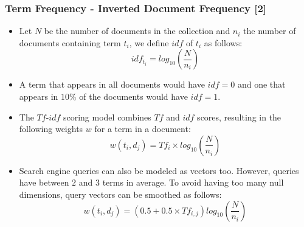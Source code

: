 \documentclass[handout]{beamer}
\begin{document}
\begin{frame}\frametitle{Term Frequency - Inverted Document Frequency [2]}
\footnotesize{ 
\begin{itemize}
 \item Let $N$ be the number of documents in the collection and $n_{i}$ the number of documents containing term $t_{i}$, we define $idf$ of $t_{i}$ as follows: 
 \begin{displaymath}
  idf_{t_{i}}= log_{10}(\frac{N}{n_{i}})
 \end{displaymath}
\item A term that appears in all documents would have $idf=0$ and one that appears in $10\%$ of the documents would have $idf=1$.

\item The $Tf$-$idf$ scoring model combines $Tf$ and $idf$ scores, resulting in the following weights $w$ for a term in a document:
\begin{displaymath}
w(t_{i},d_{j})=Tf_{i}\times log_{10}(\frac{N}{n_{i}}) 
\end{displaymath}

\item Search engine queries can also be modeled as vectors too. However, queries have  between $2$ and $3$ terms in average. To avoid having too many null dimensions, query vectors can be smoothed as follows:
\begin{displaymath}
 w(t_{i},d_{j})=(0.5+0.5\times Tf_{i,j})log_{10}(\frac{N}{n_{i}}) 
\end{displaymath}



\end{itemize}



}

\end{frame}
\end{document}
